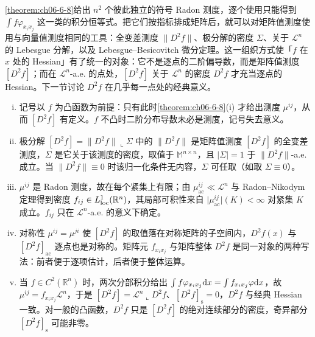 \documentclass[../../main.tex]{subfiles}%
\begin{document}
\begin{remark}\label{remark:ch06-def-6-8-记号-动机}
\cref{theorem:ch06-6-8}给出 $n^{2}$ 个彼此独立的符号 Radon 测度，逐个使用只能得到 $\int f\varphi_{x_ix_j}$ 这一类的积分恒等式。把它们按指标排成矩阵后，就可以对矩阵值测度使用与向量值测度相同的工具：全变差测度 $\lVert D^{2}f\rVert$、极分解的密度 $\Sigma$、关于 $\mathcal{L}^{n}$ 的 Lebesgue 分解，以及 Lebesgue--Besicovitch 微分定理。这一组织方式使「$f$ 在 $x$ 处的 Hessian」有了统一的对象：它不是逐点的二阶偏导数，而是矩阵值测度 $[D^{2}f]$；而在 $\mathcal{L}^{n}$-a.e. 的点处，$[D^{2}f]$ 关于 $\mathcal{L}^{n}$ 的密度 $D^{2}f$ 才充当逐点的 Hessian。下一节讨论 $D^{2}f$ 在几乎每一点处的经典意义。%
\end{remark}

\begin{remark}\label{remark:ch06-def-6-8-记号-条件}
\begin{enumerate}[(i)]
\item 记号以 $f$ 为凸函数为前提：只有此时\cref{theorem:ch06-6-8}(i) 才给出测度 $\mu^{ij}$，从而 $[D^{2}f]$ 有定义。$f$ 不凸时二阶分布导数未必是测度，记号失去意义。%
\item 极分解 $[D^{2}f]=\lVert D^{2}f\rVert\llcorner\Sigma$ 中的 $\lVert D^{2}f\rVert$ 是矩阵值测度 $[D^{2}f]$ 的全变差测度，$\Sigma$ 是它关于该测度的密度，取值于 $\mathbb{M}^{n\times n}$，且 $\lvert\Sigma\rvert=1$ 于 $\lVert D^{2}f\rVert$-a.e. 成立。当 $\lVert D^{2}f\rVert\equiv0$ 时该归一化条件无内容，$\Sigma$ 可任取（如取 $\Sigma\equiv0$）。
\item $\mu^{ij}$ 是 Radon 测度，故在每个紧集上有限；由 $\mu^{ij}_{\mathrm{ac}}\ll\mathcal{L}^{n}$ 与 Radon--Nikodym 定理得到密度 $f_{ij}\in L^{1}_{\mathrm{loc}}(\mathbb{R}^n)$，其局部可积性来自 $\lvert\mu^{ij}_{\mathrm{ac}}\rvert(K)<\infty$ 对紧集 $K$ 成立。$f_{ij}$ 只在 $\mathcal{L}^{n}$-a.e. 的意义下确定。
\item 对称性 $\mu^{ij}=\mu^{ji}$ 使 $[D^{2}f]$ 的取值落在对称矩阵的子空间内，$D^{2}f(x)$ 与 $[D^{2}f]_{\mathrm{ac}}$ 逐点也是对称的。矩阵元 $f_{x_ix_j}$ 与矩阵整体 $D^{2}f$ 是同一对象的两种写法：前者便于逐项估计，后者便于整体运算。
\item 当 $f\in C^{2}(\mathbb{R}^n)$ 时，两次分部积分给出 $\int f\varphi_{x_ix_j}\mathrm{d} x=\int f_{x_ix_j}\varphi\mathrm{d} x$，故 $\mu^{ij}=f_{x_ix_j}\mathcal{L}^{n}$，于是 $[D^{2}f]=\mathcal{L}^{n}\llcorner D^{2}f$、$[D^{2}f]_{\mathrm{s}}=0$，$D^{2}f$ 与经典 Hessian 一致。对一般的凸函数，$D^{2}f$ 只是 $[D^{2}f]$ 的绝对连续部分的密度，奇异部分 $[D^{2}f]_{\mathrm{s}}$ 可能非零。
\end{enumerate}
\end{remark}
\end{document}
